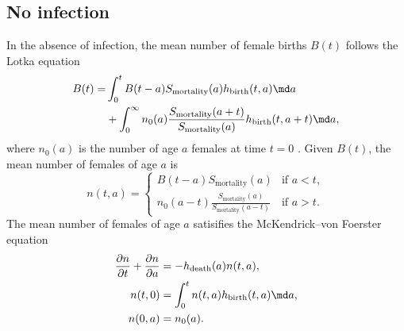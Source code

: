 \documentclass{jpmarticle}
\begin{document}
\subsection{No infection}
\label{no_infection}

In the absence of infection, the mean number of female births $B(t)$
follows the Lotka equation
\begin{equation}
  \label{lotka}
  \begin{split}
    B(t) =&
    \int_0^t B(t - a) S_{\text{mortality}}(a) h_{\text{birth}}(t, a) \md a
    \\
    & {} +
    \int_0^{\infty} n_0(a) \frac{S_{\text{mortality}}(a +
      t)}{S_{\text{mortality}}(a)} h_{\text{birth}}(t, a + t) \md a,
  \end{split}
\end{equation}
where $n_0(a)$ is the number of age $a$ females at time $t = 0$
\citetext{\citealp[Chapter VI, Section 29 on
  pp.~159--161]{harris_1963};
  \citealp[Chapter 20 on pp.~353--364]{kot_01}}.
Given $B(t)$, the mean number of females of age $a$ is
\begin{equation}
  n(t, a) =
  \begin{cases}
    B(t - a) S_{\text{mortality}}(a)
    & \text{if $a < t$},
    \\
    n_0(a - t)
    \frac{S_{\text{mortality}}(a)}{S_{\text{mortality}}(a - t)}
    & \text{if $a > t$}.
  \end{cases}
\end{equation}
The mean number of females of age $a$ satisifies the McKendrick--von
Foerster equation
\begin{equation}
  \begin{split}
    \frac{\partial n}{\partial t} + \frac{\partial n}{\partial a}
    &= - h_{\text{death}}(a) n(t, a),
    \\
    n(t, 0) &= \int_0^t n(t, a) h_{\text{birth}}(t, a) \md a,
    \\
    n(0, a) &= n_0(a).
  \end{split}
\end{equation}
\end{document}
